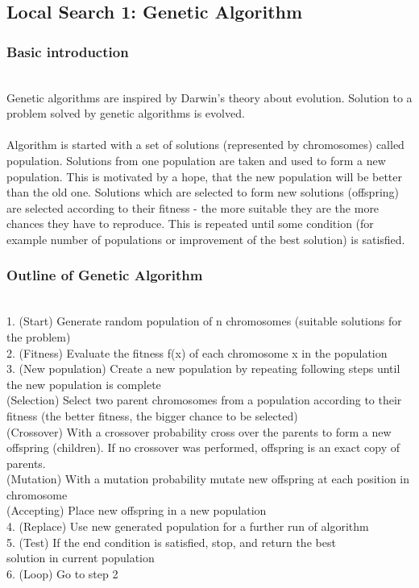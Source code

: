 \subsection{Local Search 1: Genetic Algorithm}
\subsubsection{Basic introduction}
\hfill\\
Genetic algorithms are inspired by Darwin's theory about evolution. Solution to a problem solved by genetic algorithms is evolved.\\
\\Algorithm is started with a set of solutions (represented by chromosomes) called population. Solutions from one population are taken and used to form a new population. This is motivated by a hope, that the new population will be better than the old one. Solutions which are selected to form new solutions (offspring) are selected according to their fitness - the more suitable they are the more chances they have to reproduce\cite{Cezary1991}. This is repeated until some condition (for example number of populations or improvement of the best solution) is satisfied.

\subsubsection{Outline of Genetic Algorithm}
\hfill\\
1. (Start) Generate random population of n chromosomes (suitable solutions for the problem)\\
2. (Fitness) Evaluate the fitness f(x) of each chromosome x in the population\\
3. (New population) Create a new population by repeating following steps until the new population is complete\\
 (Selection) Select two parent chromosomes from a population according to their fitness (the better fitness, the bigger chance to be selected)\\
 (Crossover) With a crossover probability cross over the parents to form a new offspring (children). If no crossover was performed, offspring is an exact copy of parents.\\
 (Mutation) With a mutation probability mutate new offspring at each position in chromosome\\
 (Accepting) Place new offspring in a new population\\
4. (Replace) Use new generated population for a further run of algorithm\\
5. (Test) If the end condition is satisfied, stop, and return the best\\ solution in current population\cite{Intro2GA}\\
6. (Loop) Go to step 2

